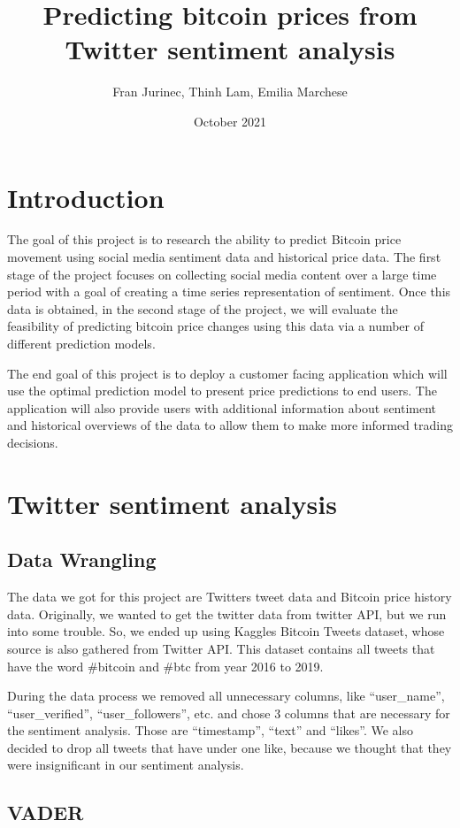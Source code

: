 \documentclass{article}
\title{\textbf{Predicting bitcoin prices from Twitter sentiment analysis}}
\author{Fran Jurinec, Thinh Lam, Emilia Marchese}
\date{October 2021}
\begin{document}
\maketitle

\section{Introduction}
The goal of this project is to research the ability to predict Bitcoin price movement using social media sentiment data and historical price data. The first stage of the project focuses on collecting social media content over a large time period with a goal of creating a time series representation of sentiment. Once this data is obtained, in the second stage of the project, we will evaluate the feasibility of predicting bitcoin price changes using this data via a number of different prediction models. 

The end goal of this project is to deploy a customer facing application which will use the optimal prediction model to present price predictions to end users.
The application will also provide users with additional information about sentiment and historical overviews of the data to allow them to make more informed trading decisions.


\section{Twitter sentiment analysis}
\subsection{Data Wrangling}

The data we got for this project are Twitters tweet data and Bitcoin price history data.  Originally, we wanted to get the twitter data from twitter API, but we run into some trouble. So, we ended up using Kaggles Bitcoin Tweets dataset, whose source is also gathered from Twitter API. This dataset contains all tweets that have the word \#bitcoin and \#btc from year 2016 to 2019.

During the data process we removed all unnecessary columns, like “user\_name”, “user\_verified”, “user\_followers”, etc. and chose 3 columns that are necessary for the sentiment analysis. Those are “timestamp”, “text” and “likes”. We also decided to drop all tweets that have under one like, because we thought that they were insignificant in our sentiment analysis. 

\subsection{VADER}
\end{document}
